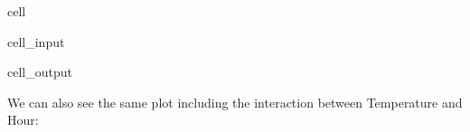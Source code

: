 \documentclass[letterpaper,10pt,english]{jupyterBook}
\begin{document}
\begin{sphinxuseclass}{cell}\begin{sphinxVerbatimInput}

\begin{sphinxuseclass}{cell_input}
\begin{sphinxVerbatim}[commandchars=\\\{\}]
   
\end{sphinxVerbatim}

\end{sphinxuseclass}\end{sphinxVerbatimInput}
\begin{sphinxVerbatimOutput}

\begin{sphinxuseclass}{cell_output}
\noindent{}

\end{sphinxuseclass}\end{sphinxVerbatimOutput}

\end{sphinxuseclass}
\sphinxAtStartPar
We can also see the same plot including the interaction between Temperature and Hour:
\end{document}
